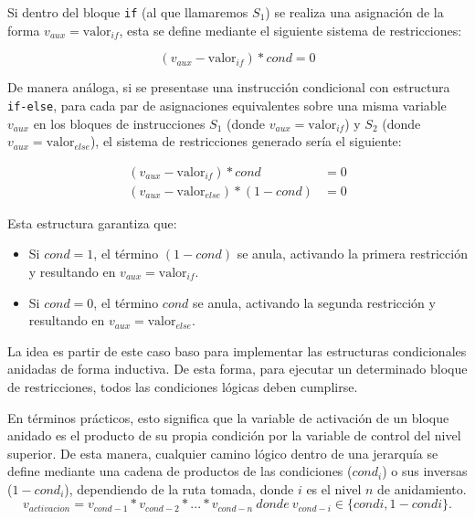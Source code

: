 \documentclass[a4paper,12pt]{report}
\begin{document}
	\vspace{0.3cm}
	\noindent Si dentro del bloque \texttt{if} (al que llamaremos $S_1$) se realiza una asignación de la forma $v_{aux} = \text{valor}_{if}$, esta se define mediante el siguiente sistema de restricciones:
	
	\begin{equation}
		(v_{aux} - \text{valor}_{if}) * cond = 0
	\end{equation}
	
	\vspace{0.3cm}
	\noindent De manera análoga, si se presentase una instrucción condicional con estructura \texttt{if-else}, para cada par de asignaciones equivalentes sobre una misma variable $v_{aux}$ en los bloques de instrucciones $S_1$ (donde $v_{aux} = \text{valor}_{if}$) y $S_2$ (donde $v_{aux} = \text{valor}_{else}$), el sistema de restricciones generado sería el siguiente:
	
	\begin{align}
		(v_{aux} - \text{valor}_{if}) * cond &= 0 \\
		(v_{aux} - \text{valor}_{else}) * (1-cond) &= 0
	\end{align}
	
	\noindent Esta estructura garantiza que:
	
	\begin{itemize}
		\item Si $cond = 1$, el término $(1-cond)$ se anula, activando la primera restricción y resultando en $v_{aux} = \text{valor}_{if}$.
		\item Si $cond = 0$, el término $cond$ se anula, activando la segunda restricción y resultando en $v_{aux} = \text{valor}_{else}$.
	\end{itemize}
	\vspace{0.3cm}
	
	
	\vspace{0.3cm}
	\noindent La idea es partir de este caso baso para implementar las estructuras condicionales anidadas de forma inductiva. De esta forma, para ejecutar un determinado bloque de restricciones, todos las condiciones lógicas deben cumplirse.
	
	\vspace{0.3cm}
	\noindent En términos prácticos, esto significa que la variable de activación de un bloque anidado es el producto de su propia condición por la variable de control del nivel superior. De esta manera, cualquier camino lógico dentro de una jerarquía se define mediante una cadena de productos de las condiciones ($cond_i$) o sus inversas ($1-cond_i$), dependiendo de la ruta tomada, donde $i$ es el nivel $n$ de anidamiento.
	\begin{equation*}
		v_{activacion} = v_{cond-1} * v_{cond-2} * ... * v_{cond-n} \ donde \ v_{cond-i} \in \{condi, 1-condi\}. 
	\end{equation*}
	
\end{document}
